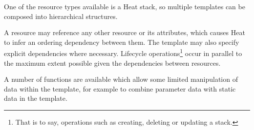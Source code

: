 One of the resource types available is a Heat stack, so multiple templates can be composed into hierarchical structures.

A resource may reference any other resource or its attributes, which causes Heat to infer an ordering dependency between them. The template may also specify explicit dependencies where necessary. Lifecycle operations\footnote{That is to say, operations such as creating, deleting or updating a stack.} occur in parallel to the maximum extent possible given the dependencies between resources.

A number of functions are available which allow some limited manipulation of data within the template, for example to combine parameter data with static data in the template.
